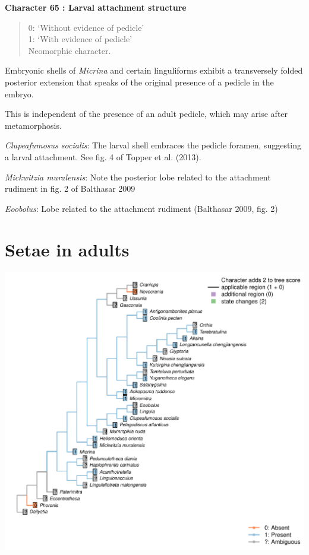 \documentclass[]{book}
\theoremstyle{definition}
\theoremstyle{definition}
\theoremstyle{definition}
\theoremstyle{remark}
\begin{document}
\textbf{Character 65 : Larval attachment structure }

\begin{quote}
0: `Without evidence of pedicle'\\
1: `With evidence of pedicle'\\
Neomorphic character.
\end{quote}

Embryonic shells of \emph{Micrina} and certain linguliforms exhibit a
transversely folded posterior extension that speaks of the original
presence of a pedicle in the embryo.

This is independent of the presence of an adult pedicle, which may arise
after metamorphosis.

\emph{Clupeafumosus socialis}: The larval shell embraces the pedicle
foramen, suggesting a larval attachment. See fig. 4 of Topper et al.
(2013).

\emph{Mickwitzia muralensis}: Note the posterior lobe related to the
attachment rudiment in fig. 2 of Balthasar 2009

\emph{Eoobolus}: Lobe related to the attachment rudiment (Balthasar
2009, fig. 2)

\hypertarget{setae-in-adults}{%
\section*{Setae in adults}\label{setae-in-adults}}

\includegraphics{Brachiopod_phylogeny_files/figure-latex/unnamed-chunk-5-66.pdf}
\end{document}
